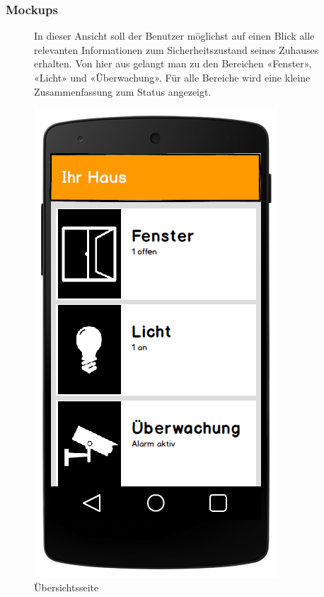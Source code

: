\subsubsection{Mockups}
\begin{figure}[htbp]
	\begin{minipage}{0.6\textwidth} 
In dieser Ansicht soll der Benutzer möglichst auf einen Blick alle relevanten Informationen zum Sicherheitszustand seines Zuhauses erhalten. Von hier aus gelangt man zu den Bereichen «Fenster», «Licht» und «Überwachung». Für alle Bereiche wird eine kleine Zusammenfassung zum Status angezeigt.
	\end{minipage}
	\hfill
	\begin{minipage}{0.32\textwidth}
		\includegraphics[width=\textwidth]{report/img/mockup_overview.png}
		\caption{Übersichtsseite}
		\label{fig:mockupOverview}
	\end{minipage}
\end{figure}



